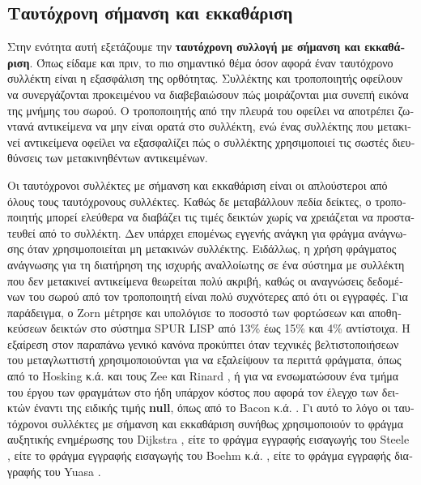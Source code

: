 \begin{greek}
\section{Ταυτόχρονη σήμανση και εκκαθάριση}
Στην ενότητα αυτή εξετάζουμε την
\textbf{ταυτόχρονη συλλογή με σήμανση και εκκαθάριση}. Όπως
είδαμε και πριν, το πιο σημαντικό θέμα όσον αφορά έναν
ταυτόχρονο συλλέκτη είναι η εξασφάλιση της ορθότητας.
Συλλέκτης και τροποποιητής οφείλουν να συνεργάζονται
προκειμένου να διαβεβαιώσουν πώς μοιράζονται μια συνεπή
εικόνα της μνήμης του σωρού. Ο τροποποιητής από την πλευρά
του οφείλει να αποτρέπει ζωντανά αντικείμενα να μην είναι
ορατά στο συλλέκτη, ενώ ένας συλλέκτης που μετακινεί
αντικείμενα οφείλει να εξασφαλίζει πώς ο συλλέκτης
χρησιμοποιεί τις σωστές διευθύνσεις των μετακινηθέντων
αντικειμένων.

Οι ταυτόχρονοι συλλέκτες με σήμανση και εκκαθάριση είναι οι
απλούστεροι από όλους τους ταυτόχρονους συλλέκτες. Καθώς δε
μεταβάλλουν πεδία δείκτες, ο τροποποιητής μπορεί ελεύθερα
να διαβάζει τις τιμές δεικτών χωρίς να χρειάζεται να
προστατευθεί από το συλλέκτη. Δεν υπάρχει επομένως εγγενής
ανάγκη για φράγμα ανάγνωσης όταν χρησιμοποιείται μη μετακινών
συλλέκτης. Ειδάλλως, η χρήση φράγματος ανάγνωσης για τη
διατήρηση της ισχυρής αναλλοίωτης σε ένα σύστημα με συλλέκτη
που δεν μετακινεί αντικείμενα θεωρείται πολύ ακριβή, καθώς οι
αναγνώσεις δεδομένων του σωρού από τον τροποποιητή είναι πολύ
συχνότερες από ότι οι εγγραφές. Για παράδειγμα, ο Zorn \cite{DBLP:conf/lfp/Zorn90}
μέτρησε και υπολόγισε το ποσοστό των φορτώσεων και αποθηκεύσεων
δεικτών στο σύστημα SPUR LISP από 13\% έως 15\% και 4\%
αντίστοιχα. Η εξαίρεση στον παραπάνω γενικό κανόνα προκύπτει
όταν τεχνικές βελτιστοποιήσεων του μεταγλωττιστή χρησιμοποιούνται
για να εξαλείψουν τα περιττά φράγματα, όπως από το Hosking κ.ά. \cite{DBLP:conf/oopsla/HoskingC99}
και τους Zee και Rinard \cite{DBLP:conf/oopsla/ZeeR02},
ή για να ενσωματώσουν ένα τμήμα του έργου των φραγμάτων στο ήδη
υπάρχον κόστος που αφορά τον έλεγχο των δεικτών έναντι της ειδικής τιμής \textbf{null},
όπως από το Bacon κ.ά. \cite{DBLP:conf/lctrts/BaconCR03}. Γι αυτό το λόγο οι
ταυτόχρονοι συλλέκτες με σήμανση και εκκαθάριση συνήθως 
χρησιμοποιούν το φράγμα αυξητικής ενημέρωσης του Dijkstra 
\cite{DBLP:conf/ac/DijkstraLMSS75,DBLP:journals/cacm/DijkstraLMSS78},
είτε το φράγμα εγγραφής εισαγωγής του Steele  \cite{DBLP:journals/cacm/Steele75},
είτε το φράγμα εγγραφής εισαγωγής του Boehm κ.ά. \cite{DBLP:conf/pldi/BoehmDS91},
είτε το φράγμα εγγραφής διαγραφής του Yuasa \cite{DBLP:journals/jss/Yuasa90}.


\end{greek}
